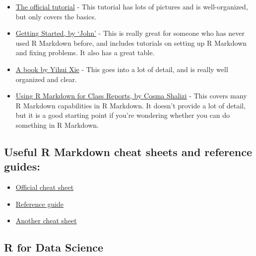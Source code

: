 \documentclass[
]{article}
\providecommand{\tightlist}{%
  \setlength{\itemsep}{0pt}\setlength{\parskip}{0pt}}
\begin{document}
\begin{itemize}
\tightlist
\item
  \href{https://rmarkdown.rstudio.com/lesson-1.html}{The official
  tutorial} - This tutorial has lots of pictures and is well-organized,
  but only covers the basics.
\item
  \href{https://ourcodingclub.github.io/2016/11/24/rmarkdown-1.html}{Getting
  Started, by `John'} - This is really great for someone who has never
  used R Markdown before, and includes tutorials on setting up R
  Markdown and fixing problems. It also has a great table.
\item
  \href{https://bookdown.org/yihui/rmarkdown/}{A book by Yihui Xie} -
  This goes into a lot of detail, and is really well organized and
  clear.
\item
  \href{http://www.stat.cmu.edu/~cshalizi/rmarkdown/}{Using R Markdown
  for Class Reports, by Cosma Shalizi} - This covers many R Markdown
  capabilities in R Markdown. It doesn't provide a lot of detail, but it
  is a good starting point if you're wondering whether you can do
  something in R Markdown.
\end{itemize}

\hypertarget{useful-r-markdown-cheat-sheets-and-reference-guides}{%
\subsection{Useful R Markdown cheat sheets and reference
guides:}\label{useful-r-markdown-cheat-sheets-and-reference-guides}}

\begin{itemize}
\tightlist
\item
  \href{https://www.rstudio.com/wp-content/uploads/2016/03/rmarkdown-cheatsheet-2.0.pdf}{Official
  cheat sheet}
\item
  \href{https://www.rstudio.com/wp-content/uploads/2015/03/rmarkdown-reference.pdf}{Reference
  guide}
\item
  \href{https://www.ethz.ch/content/dam/ethz/special-interest/math/statistics/sfs/Education/Advanced\%20Studies\%20in\%20Applied\%20Statistics/course-material-1719/Datenanalyse/rmarkdown-2.pdf}{Another
  cheat sheet}
\end{itemize}

\hypertarget{r-for-data-science}{%
\subsection{R for Data Science}\label{r-for-data-science}}
\end{document}
